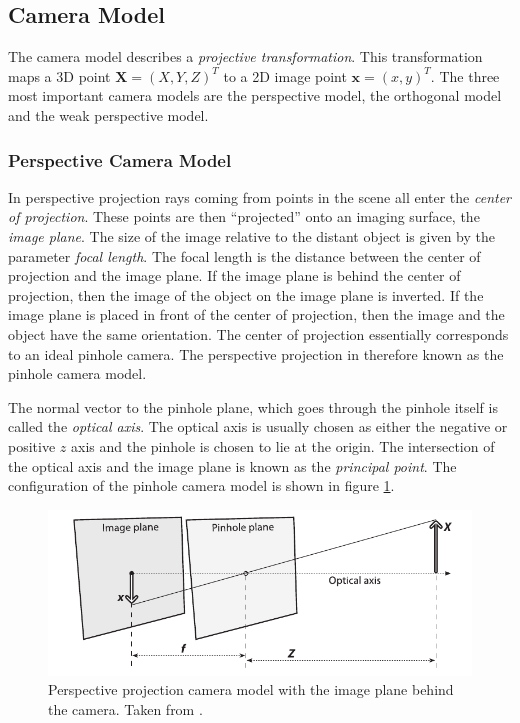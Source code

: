 \documentclass[11pt,a4paper,twoside]{report}
\begin{document}
\subsection{Camera Model}\label{s:camera}
The camera model describes a \textit{projective transformation}. This transformation maps a 3D
point $\mathbf{X} = (X,Y,Z)^T$ to a 2D image point $\mathbf{x} = (x,y)^T$. The
three most important camera models are the perspective model, the orthogonal
model and the weak perspective model.


\subsubsection{Perspective Camera Model}
In perspective projection rays coming from points in the scene all enter the \textit{center of
projection}. These points are then ``projected'' onto an imaging surface, the
\textit{image plane}. The size of the image relative to the distant object is given by
the parameter \textit{focal length}. The focal length is the distance between the
center of projection and the image plane. If the image plane is behind the
center of projection, then the image of the object on the image plane is
inverted. If the image plane is placed in front of the center of projection, then the image and
the object have the same orientation. The center of projection essentially
corresponds to an ideal pinhole camera. The perspective projection in therefore known as the
pinhole camera model. 

The normal vector to the pinhole plane, which goes through the pinhole itself is
called the \textit{optical axis}. The optical axis is usually chosen as either the
negative or positive $z$ axis and the pinhole is chosen to lie at the origin. The intersection of the optical axis and the
image plane is known as the \textit{principal point}. The configuration of the
pinhole camera model is shown in figure \ref{fg:pin}.
\begin{figure}[H] 
\centering
\includegraphics[scale=0.75]{images/pinhole.png}
\caption{Perspective projection camera model with the image plane behind the
  camera. Taken from \cite{opencv}.}
\label{fg:pin}
\end{figure}
\end{document}
